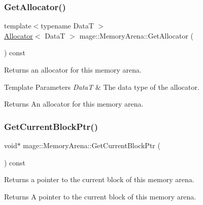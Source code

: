 \subsubsection{\texorpdfstring{Get\+Allocator()}{GetAllocator()}}
{\footnotesize\ttfamily template$<$typename DataT $>$ \\
\hyperlink{classmage_1_1_memory_arena_1_1_allocator}{Allocator}$<$ DataT $>$ mage\+::\+Memory\+Arena\+::\+Get\+Allocator (\begin{DoxyParamCaption}{ }\end{DoxyParamCaption}) const\hspace{0.3cm}{\ttfamily [noexcept]}}

Returns an allocator for this memory arena.


\begin{DoxyTemplParams}{Template Parameters}
{\em DataT} & The data type of the allocator. \\
\hline
\end{DoxyTemplParams}
\begin{DoxyReturn}{Returns}
An allocator for this memory arena. 
\end{DoxyReturn}
\hypertarget{classmage_1_1_memory_arena_a7bdbc9da32c1f8d49ce5d2f153870284}{}\label{classmage_1_1_memory_arena_a7bdbc9da32c1f8d49ce5d2f153870284} 
\subsubsection{\texorpdfstring{Get\+Current\+Block\+Ptr()}{GetCurrentBlockPtr()}}
{\footnotesize\ttfamily void$\ast$ mage\+::\+Memory\+Arena\+::\+Get\+Current\+Block\+Ptr (\begin{DoxyParamCaption}{ }\end{DoxyParamCaption}) const\hspace{0.3cm}{\ttfamily [noexcept]}}

Returns a pointer to the current block of this memory arena.

\begin{DoxyReturn}{Returns}
A pointer to the current block of this memory arena. 
\end{DoxyReturn}
\hypertarget{classmage_1_1_memory_arena_a0b41d6901c3519f046cd551931f72c1b}{}\label{classmage_1_1_memory_arena_a0b41d6901c3519f046cd551931f72c1b} 
